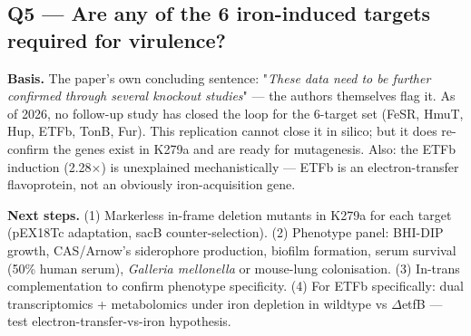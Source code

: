 \subsection*{Q5 --- Are any of the 6 iron-induced targets required for virulence?}
\textbf{Basis.} The paper's own concluding sentence: "\textit{These data need
to be further confirmed through several knockout studies}" --- the authors
themselves flag it. As of 2026, no follow-up study has closed the loop for
the 6-target set (FeSR, HmuT, Hup, ETFb, TonB, Fur). This replication cannot
close it in silico; but it does re-confirm the genes exist in K279a and are
ready for mutagenesis. Also: the ETFb induction (2.28$\times$) is unexplained
mechanistically --- ETFb is an electron-transfer flavoprotein, not an
obviously iron-acquisition gene.

\textbf{Next steps.} (1) Markerless in-frame deletion mutants in K279a for
each target (pEX18Tc adaptation, sacB counter-selection). (2) Phenotype panel:
BHI-DIP growth, CAS/Arnow's siderophore production, biofilm formation, serum
survival (50\% human serum), \textit{Galleria mellonella} or mouse-lung
colonisation. (3) In-trans complementation to confirm phenotype specificity.
(4) For ETFb specifically: dual transcriptomics + metabolomics under iron
depletion in wildtype vs $\Delta$etfB --- test electron-transfer-vs-iron
hypothesis.
